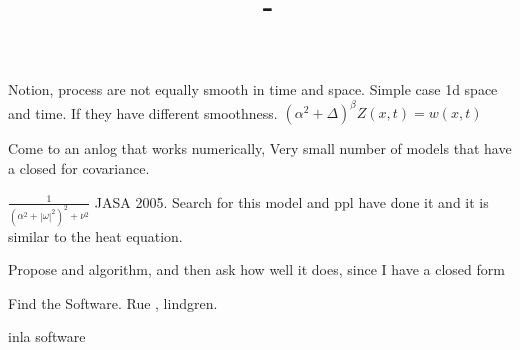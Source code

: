 \documentclass[answers,12pt,addpoints]{exam}
\author{\name}
\title{\course \ - \assignment}
\begin{document}
\maketitle

\newpage
\begin{questions}
\question Notion, process are not equally smooth in time and space.
Simple case 1d space and time. If they have different smoothness. 
$(\alpha^2 + \Delta)^\beta Z(x,t)  = w(x,t)$

Come to an anlog that works numerically, 
Very small number of models that have a closed for covariance. 

$\frac{1}{(\alpha^2 + |\omega|^2)^2 + \nu^2}$
JASA 2005. 
Search for this model and ppl have done it and it is similar to the heat equation. 

Propose and algorithm, and then ask how well it does, since I have a closed form 

Find the Software. 
Rue , lindgren. 

inla software

\end{questions}
\end{document}
